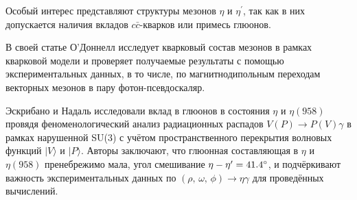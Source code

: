 
Особый интерес представляют структуры мезонов $\eta$ и $\eta^\prime$, так как в них допускается наличия вкладов $c\bar{c}$-кварков или примесь глюонов. 

В своей статье О'Доннелл \cite{ODonnell:1981sj} исследует кварковый состав мезонов в
рамках кварковой модели и проверяет получаемые результаты с помощью
экспериментальных данных, в то числе, по магнитнодипольным переходам
векторных мезонов в пару фотон-псевдоскаляр.


Эскрибано и Надаль \cite{Escribano:2007cd} исследовали вклад в глюонов в состояния $\eta$
и $\eta(958)$ провядя феноменологический анализ радиационных распадов
$V (P) \to P (V) \gamma$ в рамках нарушенной SU(3) с учётом
пространственного перекрытия волновых функций $| V \rangle$ и
$|P \rangle$. Авторы заключают, что глюонная составляющая в $\eta$ и
$\eta(958)$ пренебрежимо мала, угол смешивание
$\eta-\eta^\prime = \ang{41.4 \pm 1.3}$, и подчёркивают важность
экспериментальных данных по $(\rho, \, \omega, \, \phi ) \to \eta \gamma$ для
проведённых вычислений.

